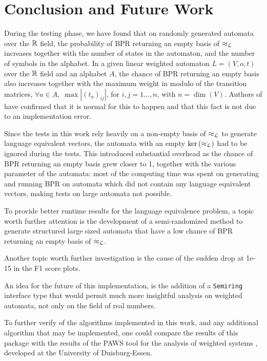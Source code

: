 \section{Conclusion and Future Work}


During the testing phase, we have found that on randomly generated automata 
over the $\mathbb{R}$ field, the probability of BPR returning an empty basis of $\approx_{\mathcal{L}}$
increases together with the number of states in the automaton, and the number of
 symbols in the alphabet.
In a given linear weighted automaton $L = (V, o,t )$
over the $\mathbb{R}$ field and an alphabet $A$, the chance of BPR returning an empty basis also
increases together with the maximum weight in modulo of the transition matrices,
$\forall a \in A, \; \max |(t_a)_{ij}|$, for $i,j=1\hdots,n$, with 
$n = \dim(V)$. Authors of \cite{BONCHI201277} have confirmed
that it is normal for this to happen and that this fact is not due
to an implementation error.

Since the tests in this work rely heavily on a non-empty basis of $\approx_{\mathcal{L}}$ to generate
language equivalent vectors, the automata with an empty $\text{ker}\left(\approx_{\mathcal{L}}\right)$ had to be ignored during the 
tests. This introduced substantial overhead as the chance of BPR returning an empty basis 
grew closer to 1, together with the various parameter of the automata: 
most of the computing time was spent on generating and running BPR on automata which did
not contain any language equivalent vectors, making tests on large automata not possible.

To provide better runtime results for the language equivalence problem, 
a topic worth further attention is the development of a semi-randomized method to 
generate structured large sized automata that have a low chance of BPR
returning an empty basis of $\approx_{\mathcal{L}}$.

Another topic worth further investigation is the cause of the 
sudden drop at 1e-15 in the F1 score plots.


An idea for the future of this implementation, is the addition
of a \texttt{Semiring} interface type that would permit much more insightful analysis
on weighted automata, not only on the field of real numbers.  

To further verify of the algorithms implemented in this work, 
and any additional algorithm that may be implemented, 
one could compare the results of this package with the results 
of the PAWS tool for the analysis of weighted systems \cite{konig2017paws}, developed 
at the University of Duisburg-Essen.
